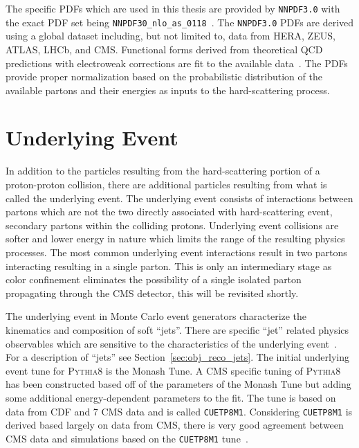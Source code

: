 The specific PDFs which are used in this thesis
 are provided by \texttt{NNPDF3.0} with the exact PDF set being 
\texttt{NNPDF30\_nlo\_as\_0118}~\cite{Ball:2014uwa, Ball:2011uy}. The \texttt{NNPDF3.0} PDFs
are derived using a global dataset including, but not limited to, data from HERA, ZEUS, ATLAS, LHCb, and CMS.
Functional forms derived from theoretical QCD predictions with electroweak corrections are fit
to the available data~\cite{Ball:2014uwa}.
The PDFs provide proper normalization based on the probabilistic distribution of the 
available partons and their energies as inputs to the hard-scattering process.



\section{Underlying Event}
In addition to the particles resulting from the hard-scattering portion of a proton-proton collision,
there are additional particles resulting from what is called the underlying event. 
The underlying event consists of interactions between
partons which are not the two directly associated with hard-scattering event, secondary partons 
within the colliding protons.
Underlying event collisions are softer and lower energy in nature which limits the range of 
the resulting physics processes. 
The most common underlying event interactions result in two partons interacting resulting in a 
single parton. This is only an intermediary stage as color confinement eliminates the possibility
of a single isolated parton propagating through the CMS detector, this will be revisited shortly.

The underlying event in 
Monte Carlo event generators characterize the kinematics and composition of soft ``jets''.
There are specific ``jet'' related physics observables which are sensitive to the characteristics of the underlying
event~\cite{Khachatryan:2015pea, Field:cdf2008}. For a description of ``jets'' see Section~\ref{sec:obj_reco_jets}.
The initial underlying event tune for \textsc{Pythia8} is the Monash Tune. A CMS specific tuning of 
\textsc{Pythia8} has been constructed based off of the parameters of the Monash Tune but adding 
some additional energy-dependent parameters to the fit. The tune is based
on data from CDF and 7 \TeV CMS data and is called \texttt{CUETP8M1}.
Considering \texttt{CUETP8M1} is derived based largely on data from
CMS, there is very good agreement between CMS data and simulations based on the
\texttt{CUETP8M1} tune~\cite{Khachatryan:2015pea}. 



